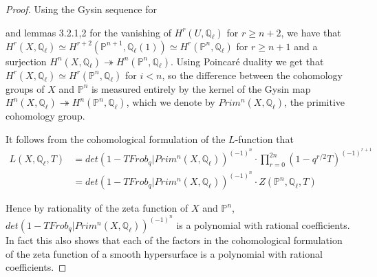 \documentclass{ucbthesis}
\theoremstyle{definition}
\theoremstyle{theorem}
\begin{document}
\begin{proof}
Using the Gysin sequence for  and lemmas 3.2.1,2 for the vanishing of $H^{r}(U,\mathbb{Q}_{\ell})$ for $r\geq n+2$, we have that $H^{r}(X,\mathbb{Q}_{\ell}) \simeq H^{r+2}(\mathbb{P}^{n+1},\mathbb{Q}_{\ell}(1)) \simeq H^{r}(\mathbb{P}^{n},\mathbb{Q}_{\ell})$ for $r \geq n+1$ and a surjection $H^{n}(X,\mathbb{Q}_{\ell})\twoheadrightarrow H^{n}(\mathbb{P}^{n},\mathbb{Q}_{\ell})$. Using Poincar\'{e} duality we get that $H^{r}(X,\mathbb{Q}_{\ell}) \simeq H^{r}(\mathbb{P}^{n},\mathbb{Q}_{\ell})$ for $i< n$, so the difference between the cohomology groups of $X$ and $\mathbb{P}^{n}$ is measured entirely by the kernel of the Gysin map $H^{n}(X,\mathbb{Q}_{\ell})\twoheadrightarrow H^{n}(\mathbb{P}^{n},\mathbb{Q}_{\ell})$, which we denote by $Prim^{n}(X,\mathbb{Q}_{\ell})$, the primitive cohomology group.  

It follows from the cohomological formulation of the $L$-function that 
\begin{align*}
L(X,\mathbb{Q}_{\ell},T) &= det(1-TFrob_{q}|Prim^{n}(X,\mathbb{Q}_{\ell}))^{(-1)^n}\cdot\prod\limits_{r=0}^{2n}(1-q^{r/2}T)^{(-1)^{r+1}} \\
&= det(1-TFrob_{q}|Prim^{n}(X,\mathbb{Q}_{\ell}))^{(-1)^n}\cdot Z(\mathbb{P}^{n},\mathbb{Q}_{\ell},T)
\end{align*}

Hence by rationality of the zeta function of $X$ and $\mathbb{P}^{n}$, $det(1-TFrob_{q}|Prim^{n}(X,\mathbb{Q}_{\ell}))^{(-1)^n}$ is a polynomial with rational coefficients. In fact this also shows that each of the factors in the cohomological formulation of the zeta function of a smooth hypersurface is a polynomial with rational coefficients.
\end{proof}
\end{document}
